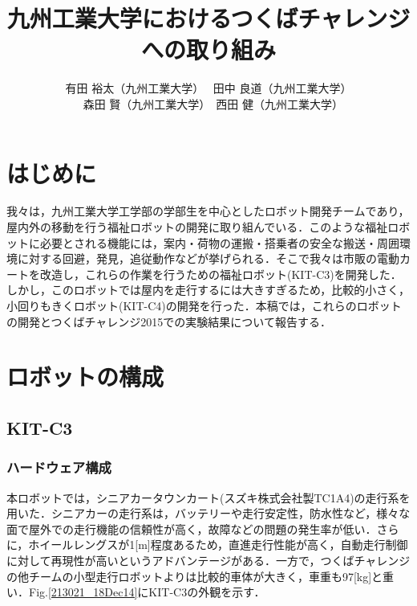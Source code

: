 \documentclass[10pt,a4paper]{jarticle}
\begin{document}
\title{\fontsize{16pt}{0pt}\selectfont 九州工業大学におけるつくばチャレンジへの取り組み}
\author{\fontsize{12pt}{0pt} 有田 裕太（九州工業大学）~ 田中 良道（九州工業大学） \\ ~ 森田 賢（九州工業大学）~西田 健（九州工業大学）}
\engtitle{
   \fontsize{16pt}{40pt}\selectfont 
}

\abstract{
\fontsize{9pt}{0pt}\selectfont
}

\maketitle\thispagestyle{empty}
\pagestyle{empty}

\section{はじめに}
\label{sec:intro}
我々は，九州工業大学工学部の学部生を中心としたロボット開発チームであり，屋内外の移動を行う福祉ロボットの開発に取り組んでいる．このような福祉ロボットに必要とされる機能には，案内・荷物の運搬・搭乗者の安全な搬送・周囲環境に対する回避，発見，追従動作などが挙げられる．そこで我々は市販の電動カートを改造し，これらの作業を行うための福祉ロボット(KIT-C3)を開発した．しかし，このロボットでは屋内を走行するには大きすぎるため，比較的小さく，小回りもきくロボット(KIT-C4)の開発を行った．本稿では，これらのロボットの開発とつくばチャレンジ2015での実験結果について報告する．

\section{ロボットの構成}
\subsection{KIT-C3}
\subsubsection{ハードウェア構成}
本ロボットでは，シニアカータウンカート(スズキ株式会社製TC1A4)の走行系を用いた．シニアカーの走行系は，バッテリーや走行安定性，防水性など，様々な面で屋外での走行機能の信頼性が高く，故障などの問題の発生率が低い．さらに，ホイールレングスが1[m]程度あるため，直進走行性能が高く，自動走行制御に対して再現性が高いというアドバンテージがある．一方で，つくばチャレンジの他チームの小型走行ロボットよりは比較的車体が大きく，車重も97[kg]と重い．Fig.\ref{213021_18Dec14}にKIT-C3の外観を示す．
\end{document}
